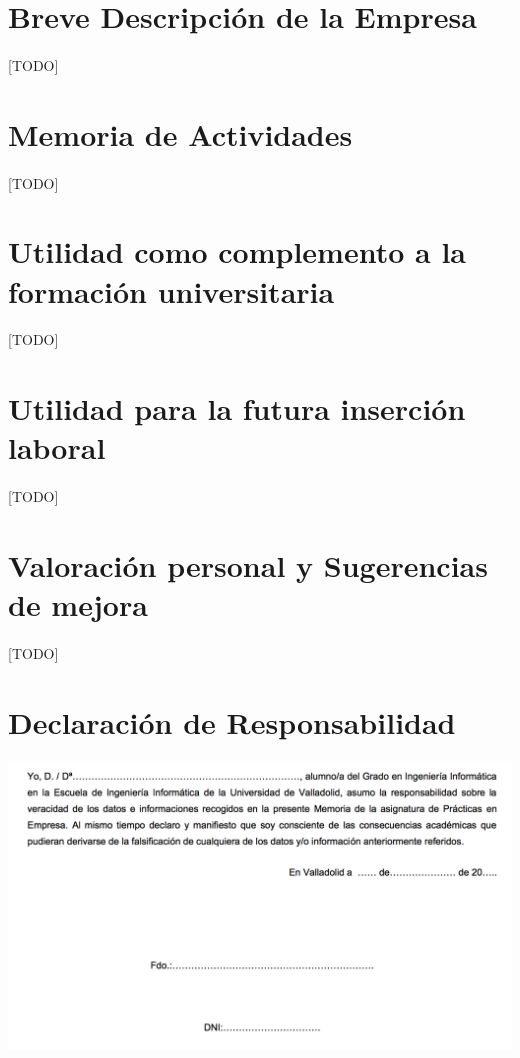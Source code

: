 \documentclass[a4paper,spanish]{article}
\begin{document}
	\newpage
  \section{Breve Descripción de la Empresa}

    \paragraph{}
    [TODO]

  \section{Memoria de Actividades}

    \paragraph{}
    [TODO]


  \section{Utilidad como complemento a la formación universitaria}

    \paragraph{}
    [TODO]


  \section{Utilidad para la futura inserción laboral}

    \paragraph{}
    [TODO]


  \section{Valoración personal y Sugerencias de mejora}

    \paragraph{}
    [TODO]

  \newpage
   \section{Declaración de Responsabilidad}

       \includegraphics[width=\textwidth]{responsibility-declaration}
\end{document}
